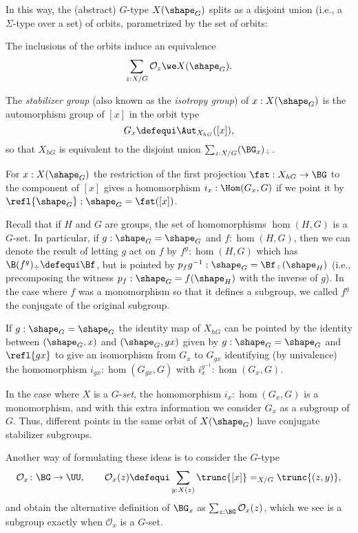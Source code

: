 In this way, the (abstract) $G$-type $X(\shape_G)$ splits as a disjoint union (i.e., a $\Sigma$-type over a set) of orbits,
parametrized by the set of orbits:
\begin{lemma}
  \label{lem:splitting into orbits}
  The inclusions of the orbits induce an equivalence 
\[
  \sum_{z : X / G} \mathcal O_z  \we X(\shape_G).
\]
\end{lemma}

The \emph{stabilizer group}
(also known as the \emph{isotropy group}) of
$x : X(\shape_G)$ is the automorphism group of $[x]$ in the orbit type
$$G_x\defequi\Aut_{X_{hG}}([x]),$$
so that
$X_{hG}$ is equivalent to the disjoint union $\sum_{z:X/G}(\BG_x)_\div$.


  For $x:X(\shape_G)$ the restriction of the first projection $\fst:X_{hG}\to\BG$ to the component of $[x]$ gives a homomorphism $i_x:\Hom(G_x,G)$ if we point it by $\refl{\shape_G}:\shape_G=\fst([x])$.

  Recall that if $H$ and $G$ are groups, the set of homomorphisms $\hom(H,G)$ is a $G$-set.  In particular, if $g:\shape_G=\shape_G$ and $f:\hom(H,G)$, then we can denote the result of letting $g$ act on $f$ by $f^g:\hom(H,G)$ which has $\B(f^g)_\div\defequi\Bf$, but is pointed by $p_fg^{-1}:\shape_G=\Bf_\div(\shape_H)$ (i.e., precomposing the witness $p_f:\shape_G=f(\shape_H)$ with the inverse of $g$).  In the case where $f$ was a monomorphism so that it defines a subgroup, we called $f^g$ the conjugate of the original subgroup.
  
 If $g:\shape_G=\shape_G$ the identity map of $X_{hG}$ can be pointed by the identity between $(\shape_G,x) $ and $(\shape_G,gx)$ given by $g:\shape_G=\shape_G$ and $\refl{gx}$ to give an isomorphism from $G_x$ to $G_{gx}$ identifying (by univalence) the homomorphism $i_{gx}:\hom(G_{gx},G)$ with $i^{g^{-1}}_x:\hom(G_x,G)$.


In the case where $X$ is a $G$-\emph{set}, the homomorphism $i_x:\hom(G_x,G)$ is a monomorphism, and with this extra information we consider $G_x$ as a subgroup of $G$.
Thus, different points in the same orbit of $X(\shape_G)$ have conjugate stabilizer subgroups.

Another way of formulating these ideas is to consider the $G$-type
\[
  \mathcal O_x\colon\BG\to\UU,\qquad
  \mathcal O_x(z)\defequi\sum_{y:X(z)}\trunc{[x]}=_{X/G}\trunc{(z,y)},
\]
and obtain the alternative definition of $\BG_x$ as $\sum_{z:\BG}\mathcal O_x(z)$, which we see is a subgroup exactly when $\mathcal O_x$ is a $G$-set.

